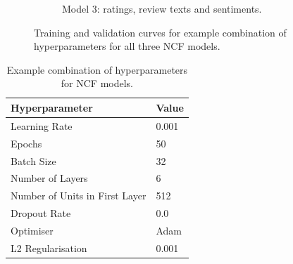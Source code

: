\begin{figure}[h]
\begin{subfigure}{0.49\textwidth}
        \caption{Model 3: ratings, review texts and sentiments.}
        \label{fig:model3_sample}
    \end{subfigure}
    \caption{Training and validation curves for example combination of hyperparameters for all three NCF models.}
    \label{train_val_curves_sample}
\end{figure}


\begin{table}[h]
    \centering
    \begin{tabular}{|p{6cm}|p{3cm}|}
    \hline
    \textbf{Hyperparameter} & \textbf{Value}  \\
    \hline
    Learning Rate & 0.001 \\
    Epochs & 50 \\
    Batch Size & 32 \\
    Number of Layers & 6 \\
    Number of Units in First Layer & 512\\
    Dropout Rate & 0.0 \\
    Optimiser & Adam \\
    L2 Regularisation & 0.001 \\
    \hline
    \end{tabular}
    \caption{Example combination of hyperparameters for NCF models.}
    \label{tab:hyper_sample}
    \end{table}



